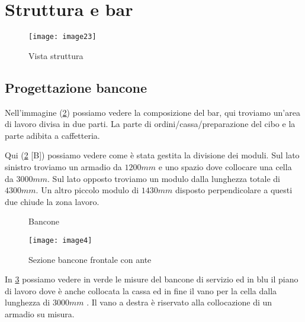 \section{Struttura e bar}



\begin{figure}[H]
	\centering
	\texttt{[image: image23]}
\end{figure}
\begin{figure}[H]
	\captionsetup[subfloat]{}
	\hspace{0.8cm}
	\hspace{1cm}
	
	\caption{Vista struttura}
	\label{fig:compsizionebar}
\end{figure}


\subsection{Progettazione bancone}

Nell'immagine (\cref{fig:bancone}) possiamo vedere la composizione del bar, qui troviamo un'area di lavoro divisa in due parti. La parte di ordini/cassa/preparazione del cibo e la parte adibita a caffetteria.


Qui  (\cref{fig:bancone} [B]) possiamo vedere come è stata gestita la divisione dei moduli. Sul lato sinistro troviamo un armadio da $1200 mm$ e uno spazio dove collocare una cella da $3000 mm$. Sul lato opposto troviamo un modulo dalla lunghezza totale di $4300 mm$.  Un  altro piccolo modulo di $1430mm$ disposto perpendicolare a questi due chiude la zona lavoro.


\begin{figure}[H]
	\captionsetup[subfloat]{farskip=2pt,captionskip=8pt}
	\centering
	\hspace{1cm}
	
	\caption{Bancone}
	\label{fig:bancone}
\end{figure}

\begin{figure}[H]
	\centering
	\texttt{[image: image4]}
	\caption{Sezione bancone frontale con ante}
	\label{fig:banconeante}
\end{figure}

\noindent
In \cref{fig:banconeante} possiamo vedere in verde le misure del bancone di servizio ed in blu il piano di lavoro dove è anche collocata la  cassa  ed in fine il vano per la cella dalla lunghezza di $3000 mm$ .  Il vano a destra è riservato alla collocazione di un armadio su misura. 

